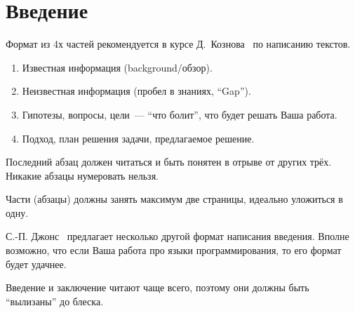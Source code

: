 
\section*{Введение}
\thispagestyle{withCompileDate}

Формат из 4х частей рекомендуется в курсе Д.~Кознова~\cite{koznov} по написанию текстов.

\begin{enumerate}
    \item Известная информация (background/обзор).
    \item Неизвестная информация (пробел в знаниях, \enquote{Gap}).
    \item Гипотезы, вопросы, цели~--- \enquote{что болит}, что будет решать Ваша работа.
    \item Подход, план решения задачи, предлагаемое решение.
\end{enumerate}

Последний абзац должен читаться и быть понятен в отрыве от других трёх. Никакие абзацы нумеровать нельзя.

Части (абзацы) должны занять максимум две страницы, идеально уложиться в одну.

С.-П. Джонс~\cite{SPJGreatPaper} предлагает несколько другой формат написания введения.
Вполне возможно, что если Ваша работа про языки программирования, то его формат будет удачнее.

Введение и заключение читают чаще всего, поэтому они должны быть \enquote{вылизаны} до блеска.

